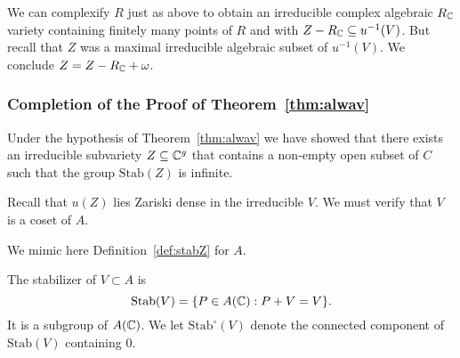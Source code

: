 We can complexify $R$ just as above to obtain an irreducible
complex algebraic $R_{\mathbb{C}}$ variety containing finitely many points of
$R$ and with $Z-R_{{\mathbb{C}}} \subseteq u^{-1}(V)$.
But recall that $Z$ was a maximal irreducible algebraic subset of
$u^{-1}(V)$. We conclude $Z = Z - R_{{\mathbb{C}}}+\omega$.


\subsubsection{Completion of the Proof of Theorem~\ref{thm:alwav}}

Under the hypothesis of Theorem~\ref{thm:alwav} we have showed that
there exists an irreducible subvariety $Z\subseteq{\mathbb{C}}^g$ that contains a
non-empty open subset of $C$ such that the group $\mathrm{Stab}(Z)$ is infinite.



  

Recall that $u(Z)$ lies Zariski dense in the irreducible $V$. We must
verify that $V$ is a coset of $A$. %

We mimic here Definition~\ref{def:stabZ} for $A$. 
\begin{definition}
  The stabilizer of $V\subset A$ is
  \begin{equation*}
    \mathrm{Stab}(V) = \{P\in A({\mathbb{C}}) : P+V=V\}. 
  \end{equation*}
  It is a subgroup of $A({\mathbb{C}})$. We let $\mathrm{Stab}^\circ(V)$ denote
  the connected component of $\mathrm{Stab}(V)$ containing $0$. 
\end{definition}



